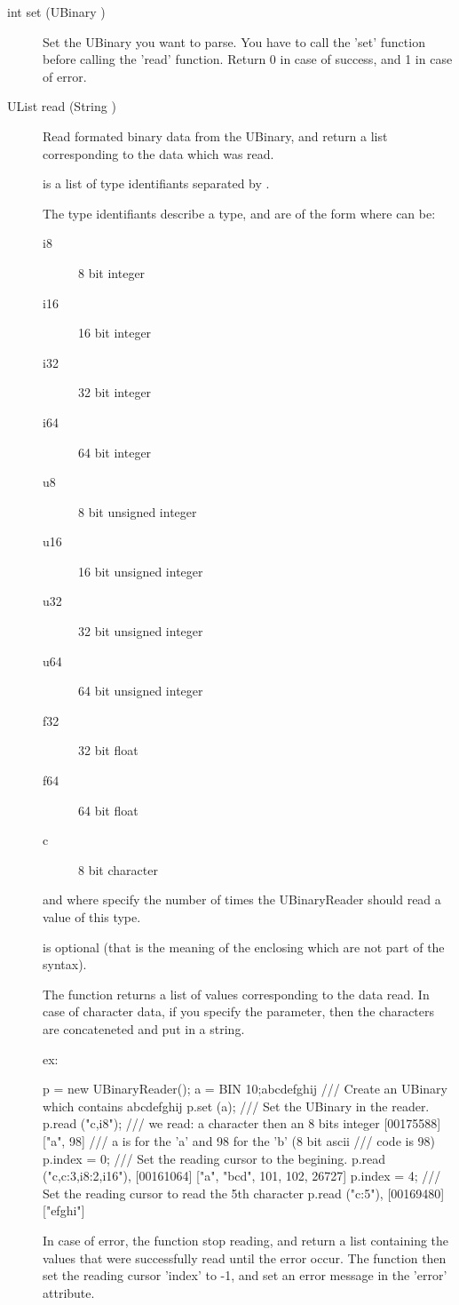 \noindent
\begin{description}
\item[{int set (UBinary )}] Set the UBinary you want to
  parse. You have to call the 'set' function before calling the 'read'
  function.  Return 0 in case of success, and 1 in case of error.

\item[{UList read (String )}] Read formated binary data
  from the UBinary, and return a list corresponding to the data which
  was read.

   is a list of type identifiants separated by \samp{,}.

  The type identifiants describe a type, and are of the form
   where  can be:
  \begin{description}
  \item[i8]   8 bit integer
  \item[i16] 16 bit integer
  \item[i32] 32 bit integer
  \item[i64] 64 bit integer
  \item[u8]   8 bit unsigned integer
  \item[u16] 16 bit unsigned integer
  \item[u32] 32 bit unsigned integer
  \item[u64] 64 bit unsigned integer
  \item[f32] 32 bit float
  \item[f64] 64 bit float
  \item[c]    8 bit character
  \end{description}
  and where  specify the number of times the UBinaryReader
  should read a value of this type.

   is optional (that is the meaning of the enclosing \samp{[}
  \samp{]} which are not part of the syntax).

  The function returns a list of values corresponding to the data
  read.  In case of character data, if you specify the 
  parameter, then the characters are concateneted and put in a string.

  ex:
\begin{urbifixme}
p = new UBinaryReader();
a = BIN 10;abcdefghij   /// Create an UBinary which contains abcdefghij
p.set (a);              /// Set the UBinary in the reader.
p.read ("c,i8");        /// we read: a character then an 8 bits integer
[00175588] ["a", 98]    /// a is for the 'a' and 98 for the 'b' (8 bit ascii
                        /// code is 98)
p.index = 0;            /// Set the reading cursor to the begining.
p.read ("c,c:3,i8:2,i16"),
[00161064] ["a", "bcd", 101, 102, 26727]
p.index = 4;            /// Set the reading cursor to read the 5th character
p.read ("c:5"),
[00169480] ["efghi"]
\end{urbifixme}

  In case of error, the function stop reading, and return a list
  containing the values that were successfully read until the error
  occur. The function then set the reading cursor 'index' to -{}1, and
  set an error message in the 'error' attribute.
\end{description}

